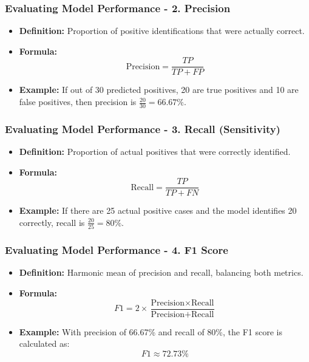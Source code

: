 \documentclass[aspectratio=169]{beamer}
\begin{document}
\begin{frame}[fragile]
    \frametitle{Evaluating Model Performance - 2. Precision}
    \begin{itemize}
        \item \textbf{Definition:} Proportion of positive identifications that were actually correct.
        \item \textbf{Formula:} 
        \begin{equation}
            \text{Precision} = \frac{TP}{TP + FP}
        \end{equation}
        \item \textbf{Example:} If out of 30 predicted positives, 20 are true positives and 10 are false positives, then precision is \( \frac{20}{30} = 66.67\% \).
    \end{itemize}
\end{frame}

\begin{frame}[fragile]
    \frametitle{Evaluating Model Performance - 3. Recall (Sensitivity)}
    \begin{itemize}
        \item \textbf{Definition:} Proportion of actual positives that were correctly identified.
        \item \textbf{Formula:} 
        \begin{equation}
            \text{Recall} = \frac{TP}{TP + FN}
        \end{equation}
        \item \textbf{Example:} If there are 25 actual positive cases and the model identifies 20 correctly, recall is \( \frac{20}{25} = 80\% \).
    \end{itemize}
\end{frame}

\begin{frame}[fragile]
    \frametitle{Evaluating Model Performance - 4. F1 Score}
    \begin{itemize}
        \item \textbf{Definition:} Harmonic mean of precision and recall, balancing both metrics.
        \item \textbf{Formula:} 
        \begin{equation}
            F1 = 2 \times \frac{\text{Precision} \times \text{Recall}}{\text{Precision} + \text{Recall}}
        \end{equation}
        \item \textbf{Example:} With precision of 66.67\% and recall of 80\%, the F1 score is calculated as:
        \begin{equation}
            F1 \approx 72.73\%
        \end{equation}
    \end{itemize}
\end{frame}
\end{document}
